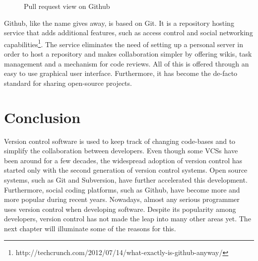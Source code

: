 \begin{figure}[h!]
 \centering
 \caption{Pull request view on Github}
 \label{fig:github-pr}
\end{figure}

Github, like the name gives away, is based on Git. It is a repository hosting service that adds additional features, such as access control and social networking capabilities\footnote{http://techcrunch.com/2012/07/14/what-exactly-is-github-anyway/}. The service eliminates the need of setting up a personal server in order to host a  repository and makes collaboration simpler by offering wikis, task management and a mechanism for code reviews. All of this is offered through an easy to use graphical user interface. Furthermore, it has become the de-facto standard for sharing open-source projects.

\section{Conclusion}
Version control software is used to keep track of changing code-bases and to simplify the collaboration between developers. Even though some VCSs have been around for a few decades, the widespread adoption of version control has started only with the second generation of version control systems. Open source systems, such as Git and Subversion, have further accelerated this development. Furthermore, social coding platforms, such as Github, have become more and more popular during recent years. Nowadays, almost any serious programmer uses version control when developing software. Despite its popularity among developers, version control has not made the leap into many other areas yet. The next chapter will illuminate some of the reasons for this.



